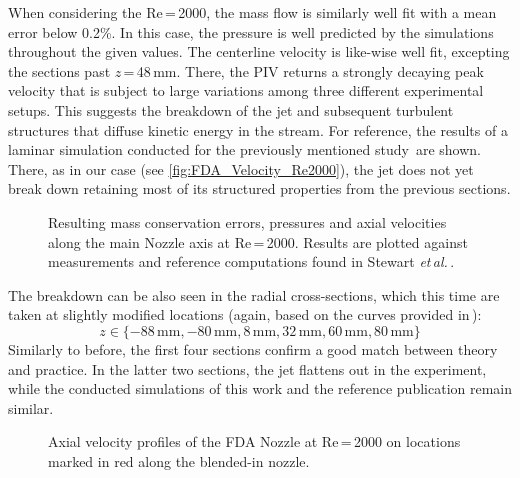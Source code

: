 When considering the Re\,=\,2000, the mass flow is similarly well fit with a mean error below 0.2\%. In this case, the pressure is well predicted by the simulations throughout the given values. The centerline velocity is like-wise well fit, excepting the sections past $z$\,=\,48\,mm. There, the PIV returns a strongly decaying peak velocity that is subject to large variations among three different experimental setups. This suggests the breakdown of the jet and subsequent turbulent structures that diffuse kinetic energy in the stream. For reference, the results of a laminar simulation conducted for the previously mentioned study\,\cite{Stewart2012} are shown. There, as in our case (see \autoref{fig:FDA_Velocity_Re2000}), the jet does not yet break down retaining most of its structured properties from the previous sections.
\begin{figure}[htbp]
	\centering
	
	\vspace*{-1cm}
	\caption[Centerline results for the FDA Nozzle at Re\,=\,2000]{Resulting mass conservation errors, pressures and axial velocities along the main Nozzle axis at Re\,=\,2000. Results are plotted against measurements and reference computations found in Stewart \textit{et\,al.}\,\cite{Stewart2012}.}\label{fig:ctrl_FDA_Re2000}
\end{figure}
The breakdown can be also seen in the radial cross-sections, which this time are taken at slightly modified locations (again, based on the curves provided in\,\cite{Stewart2012}):
\[
	z \in \{-88\,\text{mm}, -80\,\text{mm}, 8\,\text{mm}, 32\,\text{mm}, 60\,\text{mm}, 80\,\text{mm}\}
\]
Similarly to before, the first four sections confirm a good match between theory and practice. In the latter two sections, the jet flattens out in the experiment, while the conducted simulations of this work and the reference publication remain similar.
\begin{figure}[htb]
	\centering
	\vspace*{-0.3cm}
	
	\vspace*{-0.7cm}
	\caption[Axial velocity profiles of the FDA Nozzle at Re\,=\,2000]{Axial velocity profiles of the FDA Nozzle at Re\,=\,2000 on locations marked in red along the blended-in nozzle.}\label{fig:FDA_Re2000}
\end{figure}

